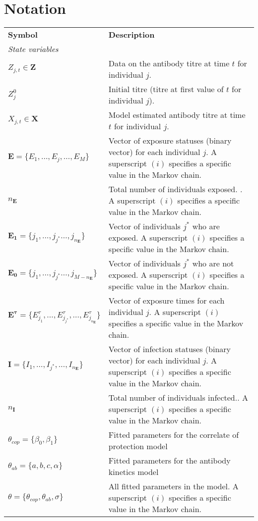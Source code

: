 
\section{Notation}

\begin{table}[H]
	\label{table:not_sim}
    \centering
    \begin{tabular}{| l | p{} |}
         \hline
        \textbf{Symbol} & \textbf{Description} \\
        \textit{State variables} & \\
               \hline
        $Z_{j, t} \in \mathbf{Z}$ & Data on the antibody titre at time $t$ for individual $j$. \\
        \hline
        $Z^0_j$ & Initial titre (titre at first value of $t$ for individual $j$). \\ 
        \hline
         $X_{j, t} \in \mathbf{X}$ & Model estimated antibody titre at time $t$ for individual $j$. \\
        \hline
        $\mathbf{E} = \{E_1, \dots, E_j, \dots, E_M\}$ &Vector of exposure statuses (binary vector) for each individual $j$. A superscript $(i)$ specifies a specific value in the Markov chain.\\
	\hline
        $n_\mathbf{E}$ & Total number of individuals exposed. . A superscript $(i)$ specifies a specific value in the Markov chain.\\
	\hline
        $\mathbf{E_{1}} = \{j_1, \dots,j_{j^*} \dots, j_{n_\mathbf{E}}\}$ & Vector of individuals $j^*$ who are exposed. A superscript $(i)$ specifies a specific value in the Markov chain.\\
	\hline
        $\mathbf{E_{0}} = \{j_1, \dots,j_{j^*} \dots, j_{M - n_\mathbf{E}}\}$ & Vector of individuals $j^*$ who are not exposed. A superscript $(i)$ specifies a specific value in the Markov chain.\\
	\hline
        $\mathbf{E^\tau} = \{E^\tau_{j_1}, \dots, E^\tau_{j_{j^*}}, \dots, E^\tau_{j_{n_\mathbf{E}}}\}$ & Vector of exposure times for each individual $j$. A superscript $(i)$ specifies a specific value in the Markov chain.\\
        \hline
        $\mathbf{I} = \{I_1, \dots, I_{j^*}, \dots, I_{n_\mathbf{E}}\}$ & Vector of infection statuses (binary vector) for each individual $j$. A superscript $(i)$ specifies a specific value in the Markov chain. \\
        \hline
         $n_\mathbf{I}$ & Total number of individuals infected.. A superscript $(i)$ specifies a specific value in the Markov chain. \\	 \hline
         $\theta_{cop} = \{\beta_0, \beta_1\}$ & Fitted parameters for the correlate of protection model\\ \hline
         $\theta_{ab} = \{a, b, c, \alpha\}$ & Fitted parameters for the antibody kinetics model \\ \hline
         $\theta = \{\theta_{cop}, \theta_{ab}, \sigma\}$ & All fitted parameters in the model.  A superscript $(i)$ specifies a specific value in the Markov chain. \\


\end{tabular}
\end{table}
